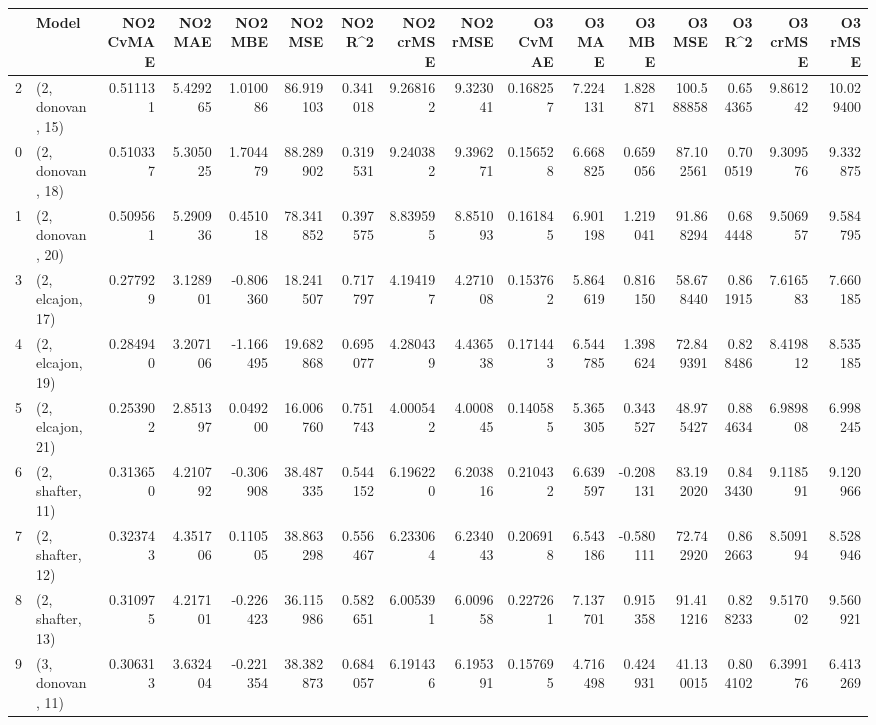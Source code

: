 \begin{tabular}{llrrrrrrrrrrrrrr}
\toprule
{} &             Model &  NO2 CvMAE &   NO2 MAE &   NO2 MBE &    NO2 MSE &   NO2 R\textasciicircum2 &  NO2 crMSE &  NO2 rMSE &  O3 CvMAE &    O3 MAE &    O3 MBE &      O3 MSE &    O3 R\textasciicircum2 &   O3 crMSE &    O3 rMSE \\
\midrule
2  &  (2, donovan, 15) &   0.511131 &  5.429265 &  1.010086 &  86.919103 &  0.341018 &   9.268162 &  9.323041 &  0.168257 &  7.224131 &  1.828871 &  100.588858 &  0.654365 &   9.861242 &  10.029400 \\
0  &  (2, donovan, 18) &   0.510337 &  5.305025 &  1.704479 &  88.289902 &  0.319531 &   9.240382 &  9.396271 &  0.156528 &  6.668825 &  0.659056 &   87.102561 &  0.700519 &   9.309576 &   9.332875 \\
1  &  (2, donovan, 20) &   0.509561 &  5.290936 &  0.451018 &  78.341852 &  0.397575 &   8.839595 &  8.851093 &  0.161845 &  6.901198 &  1.219041 &   91.868294 &  0.684448 &   9.506957 &   9.584795 \\
3  &  (2, elcajon, 17) &   0.277929 &  3.128901 & -0.806360 &  18.241507 &  0.717797 &   4.194197 &  4.271008 &  0.153762 &  5.864619 &  0.816150 &   58.678440 &  0.861915 &   7.616583 &   7.660185 \\
4  &  (2, elcajon, 19) &   0.284940 &  3.207106 & -1.166495 &  19.682868 &  0.695077 &   4.280439 &  4.436538 &  0.171443 &  6.544785 &  1.398624 &   72.849391 &  0.828486 &   8.419812 &   8.535185 \\
5  &  (2, elcajon, 21) &   0.253902 &  2.851397 &  0.049200 &  16.006760 &  0.751743 &   4.000542 &  4.000845 &  0.140585 &  5.365305 &  0.343527 &   48.975427 &  0.884634 &   6.989808 &   6.998245 \\
6  &  (2, shafter, 11) &   0.313650 &  4.210792 & -0.306908 &  38.487335 &  0.544152 &   6.196220 &  6.203816 &  0.210432 &  6.639597 & -0.208131 &   83.192020 &  0.843430 &   9.118591 &   9.120966 \\
7  &  (2, shafter, 12) &   0.323743 &  4.351706 &  0.110505 &  38.863298 &  0.556467 &   6.233064 &  6.234043 &  0.206918 &  6.543186 & -0.580111 &   72.742920 &  0.862663 &   8.509194 &   8.528946 \\
8  &  (2, shafter, 13) &   0.310975 &  4.217101 & -0.226423 &  36.115986 &  0.582651 &   6.005391 &  6.009658 &  0.227261 &  7.137701 &  0.915358 &   91.411216 &  0.828233 &   9.517002 &   9.560921 \\
9  &  (3, donovan, 11) &   0.306313 &  3.632404 & -0.221354 &  38.382873 &  0.684057 &   6.191436 &  6.195391 &  0.157695 &  4.716498 &  0.424931 &   41.130015 &  0.804102 &   6.399176 &   6.413269 \\

\end{tabular}
